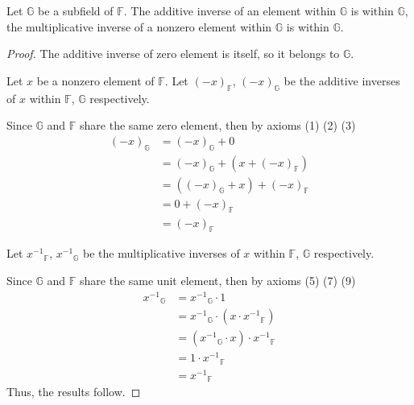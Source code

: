 \begin{theorem}
    Let $\mathbb{G}$ be a subfield of $\mathbb{F}$. The additive inverse of an element within $\mathbb{G}$ is within $\mathbb{G}$, the multiplicative inverse of a nonzero element within $\mathbb{G}$ is within $\mathbb{G}$.
\end{theorem}

\begin{proof}
    The additive inverse of zero element is itself, so it belongs to $\mathbb{G}$.

    Let $x$ be a nonzero element of $\mathbb{F}$. Let ${(-x)}_{\mathbb{F}}$, ${(-x)}_{\mathbb{G}}$ be the additive inverses of $x$ within $\mathbb{F}$, $\mathbb{G}$ respectively.

    Since $\mathbb{G}$ and $\mathbb{F}$ share the same zero element, then by axioms (1) (2) (3)
    \begin{align*}
        {(-x)}_{\mathbb{G}} & = {(-x)}_{\mathbb{G}} + 0                         \\
                            & = {(-x)}_{\mathbb{G}} + (x + {(-x)}_{\mathbb{F}}) \\
                            & = ({(-x)}_{\mathbb{G}} + x) + {(-x)}_{\mathbb{F}} \\
                            & = 0 + {(-x)}_{\mathbb{F}}                         \\
                            & = {(-x)}_{\mathbb{F}}
    \end{align*}

    Let ${x^{-1}}_{\mathbb{F}}$, ${x^{-1}}_{\mathbb{G}}$ be the multiplicative inverses of $x$ within $\mathbb{F}$, $\mathbb{G}$ respectively.

    Since $\mathbb{G}$ and $\mathbb{F}$ share the same unit element, then by axioms (5) (7) (9)
    \begin{align*}
        {x^{-1}}_{\mathbb{G}} & = {x^{-1}}_{\mathbb{G}}\cdot 1                              \\
                              & = {x^{-1}}_{\mathbb{G}}\cdot (x\cdot {x^{-1}}_{\mathbb{F}}) \\
                              & = ({x^{-1}}_{\mathbb{G}}\cdot x)\cdot {x^{-1}}_{\mathbb{F}} \\
                              & = 1\cdot {x^{-1}}_{\mathbb{F}}                              \\
                              & = {x^{-1}}_{\mathbb{F}}
    \end{align*}
    Thus, the results follow.
\end{proof}


